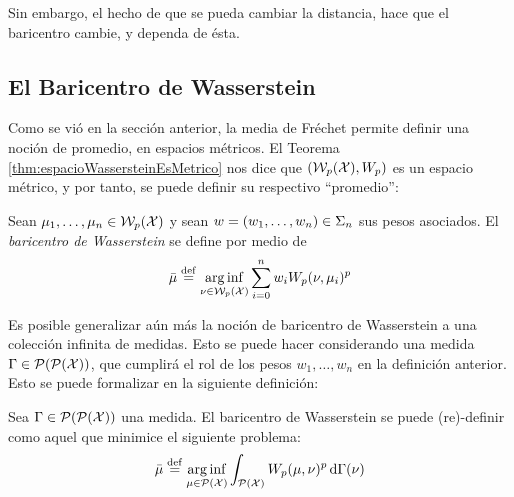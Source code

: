 {{{\begin{remark}
			  Sin embargo, el hecho de que se pueda cambiar la distancia, hace que el baricentro cambie, y dependa de ésta.
		  \end{remark}



	  }  %

	  \subsection*{El Baricentro de Wasserstein}\label{ssec:el-baricentro-de-Wasserstein}
	  {
		  Como se vió en la sección anterior, la media de Fréchet permite definir una noción de promedio, en espacios métricos. El Teorema \ref{thm:espacioWassersteinEsMetrico} nos dice que $(\WassersteinSpace[p]{\cX}, W_p)$ es un espacio métrico, y por tanto, se puede definir su respectivo ``promedio'':
		  \begin{definition}
			  Sean $\mu_1,\ldots, \mu_n \in \WassersteinSpace[p]{\cX} $ y sean $w = (w_1,\ldots, w_n) \in \Simplex[n]$ sus pesos asociados. El \emph{baricentro de Wasserstein} se define por medio de
			  \begin{equation}
				  \bar \mu \eqdef \arginf_{\nu \in \WassersteinSpace[p]{\cX} } \sum_{i=0}^{n} w_i \Wasserstein[p]{\nu}{\mu_i}^p
			  \end{equation}

		  \end{definition}

		  Es posible generalizar aún más la noción de baricentro de Wasserstein a una colección infinita de medidas. Esto se puede hacer considerando una medida $\Gamma \in \ProbSpace[\ProbSpace ] $, que cumplirá el rol de los pesos $w_1,\ldots, w_n $ en la definición anterior. Esto se puede formalizar en la siguiente definición:

		  \begin{definition}
			  Sea $\Gamma \in \ProbSpace[\ProbSpace]$ una medida. El baricentro de Wasserstein se puede (re)-definir como aquel que minimice el siguiente problema:
			  \begin{equation}
				  \bar \mu \eqdef \arginf_{\mu \in \ProbSpace} \int_{\ProbSpace} \Wasserstein[p]{\mu}{\nu}^p \dd{\Gamma(\nu)}
			  \end{equation}

		  \end{definition}


	  }  %



  }  %

 }